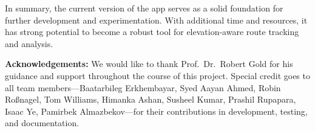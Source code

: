\documentclass[12pt]{article}
\begin{document}
In summary, the current version of the app serves as a solid foundation for further development and experimentation. With additional time and resources, it has strong potential to become a robust tool for elevation-aware route tracking and analysis.

\bigskip

\textbf{Acknowledgements:}  
We would like to thank Prof.\ Dr.\ Robert Gold for his guidance and support throughout the course of this project. Special credit goes to all team members—Baatarbileg Erkhembayar, Syed Aayan Ahmed, Robin Roßnagel, Tom Williams, Himanka Ashan, Susheel Kumar, Prashil Rupapara, Isaac Ye, Pamirbek Almazbekov—for their contributions in development, testing, and documentation.
\end{document}
